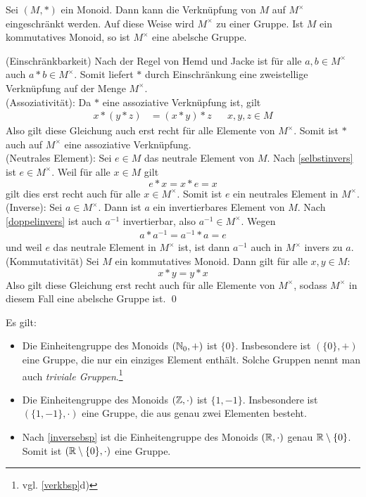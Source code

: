 \begin{sat} \label{einheitengruppe}
 Sei $(M,*)$ ein Monoid. Dann kann die Verknüpfung von $M$ auf $M^\times$ eingeschränkt werden. Auf diese Weise wird $M^\times$ zu einer Gruppe. Ist $M$ ein kommutatives Monoid, so ist $M^\times$ eine abelsche Gruppe.
\end{sat}
\begin{bew}
(Einschränkbarkeit) Nach der Regel von Hemd und Jacke ist für alle $a,b\in M^\times$ auch $a*b\in M^\times$. Somit liefert $*$ durch Einschränkung eine zweistellige Verknüpfung auf der Menge $M^\times$. \\[0.5em]
(Assoziativität): Da $*$ eine assoziative Verknüpfung ist, gilt
\begin{align*}
 x*(y*z) & = (x*y)*z && x,y,z\in M
\end{align*}
Also gilt diese Gleichung auch erst recht für alle Elemente von $M^\times$. Somit ist $*$ auch auf $M^\times$ eine assoziative Verknüpfung. \\[0.5em]
(Neutrales Element): Sei $e\in M$ das neutrale Element von $M$. Nach \cref{selbstinvers} ist $e\in M^\times$. Weil für alle $x\in M$ gilt
\[ e*x=x*e=x \]
gilt dies erst recht auch für alle $x\in M^\times$. Somit ist $e$ ein neutrales Element in $M^\times$. \\[0.5em]
(Inverse): Sei $a\in M^\times$. Dann ist $a$ ein invertierbares Element von $M$. Nach \cref{doppelinvers} ist auch $a^{-1}$ invertierbar, also $a^{-1}\in M^\times$. Wegen
\begin{align*}
 a*a^{-1}=a^{-1}*a=e
\end{align*}
und weil $e$ das neutrale Element in $M^\times$ ist, ist dann $a^{-1}$ auch in $M^\times$ invers zu $a$. \\[0.5em]
(Kommutativität) Sei $M$ ein kommutatives Monoid. Dann gilt für alle $x,y\in M$:
\[ x*y=y*x \]
Also gilt diese Gleichung erst recht auch für alle Elemente von $M^\times$, sodass $M^\times$ in diesem Fall eine abelsche Gruppe ist. \qed
\end{bew}







\begin{bsp}
Es gilt:
\begin{itemize}
 \item Die Einheitengruppe des Monoids $({\mathbb N}_0,+)$ ist $\{0\}$. Insbesondere ist $(\{0\},+)$ eine Gruppe, die nur ein einziges Element enthält. Solche Gruppen nennt man auch \emph{triviale Gruppen}.\footnote{vgl. \cref{verkbsp}d)}
 \item Die Einheitengruppe des Monoids $({\mathbb Z},\cdot)$ ist $\{1,-1\}$. Insbesondere ist $(\{1,-1\},\cdot)$ eine Gruppe, die aus genau zwei Elementen besteht.
 \item Nach \cref{inversebsp} ist die Einheitengruppe des Monoids $({\mathbb R},\cdot)$ genau ${\mathbb R}\setminus \{0\}$. Somit ist $({\mathbb R}\setminus \{0\},\cdot)$ eine Gruppe.
\end{itemize}
\end{bsp}




